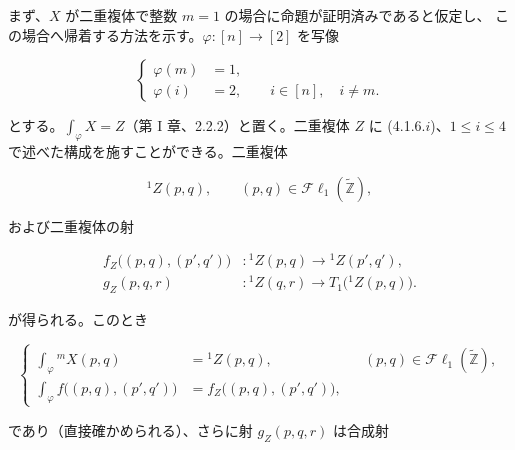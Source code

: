 \clearpage
{}%
\begingroup\small\setlength{\parskip}{0pt}\setlength{\emergencystretch}{1.5em}
\setlength{\abovedisplayskip}{4pt plus 2pt minus 2pt}%
\setlength{\belowdisplayskip}{4pt plus 2pt minus 2pt}%

まず、$X$ が二重複体で整数 $m=1$ の場合に命題が証明済みであると仮定し、
この場合へ帰着する方法を示す。$\varphi\colon[n]\longrightarrow[2]$ を写像

\begin{equation}
\left\{
\begin{aligned}
\varphi(m)&=1,\\
\varphi(i)&=2,\qquad i\in[n],\quad i\neq m.
\end{aligned}
\right.
\tag{4.1.7.1}
\end{equation}

とする。$\int_\varphi X=Z$（第 I 章、2.2.2）と置く。二重複体 $Z$ に
(4.1.6.$i$)、$1\leq i\leq4$ で述べた構成を施すことができる。二重複体

\begin{equation}
{}^{1}\!Z(p,q),\qquad
(p,q)\in\mathcal{F}\ell_1(\widetilde{\mathbb Z}),
\tag{4.1.7.2}
\end{equation}

および二重複体の射

\begin{equation}
\begin{aligned}
f_Z\bigl((p,q),(p',q')\bigr)&\colon
{}^{1}\!Z(p,q)\longrightarrow{}^{1}\!Z(p',q'),\\
g_Z(p,q,r)&\colon
{}^{1}\!Z(q,r)\longrightarrow T_1\bigl({}^{1}\!Z(p,q)\bigr).
\end{aligned}
\tag{4.1.7.3}
\end{equation}

が得られる。このとき

\begin{equation}
\left\{
\begin{aligned}
\int_\varphi{}^{m}\!X(p,q)
  &={}^{1}\!Z(p,q),
  &&(p,q)\in\mathcal{F}\ell_1(\widetilde{\mathbb Z}),\\
\int_\varphi f\bigl((p,q),(p',q')\bigr)
  &=f_Z\bigl((p,q),(p',q')\bigr),
\end{aligned}
\right.
\tag{4.1.7.4}
\end{equation}

であり（直接確かめられる）、さらに射 $g_Z(p,q,r)$ は合成射

